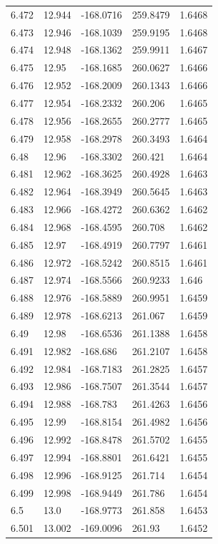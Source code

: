 \begin{tabular}{lllll}
6.472 & 12.944 & -168.0716 & 259.8479 & 1.6468 \\
6.473 & 12.946 & -168.1039 & 259.9195 & 1.6468 \\
6.474 & 12.948 & -168.1362 & 259.9911 & 1.6467 \\
6.475 & 12.95 & -168.1685 & 260.0627 & 1.6466 \\
6.476 & 12.952 & -168.2009 & 260.1343 & 1.6466 \\
6.477 & 12.954 & -168.2332 & 260.206 & 1.6465 \\
6.478 & 12.956 & -168.2655 & 260.2777 & 1.6465 \\
6.479 & 12.958 & -168.2978 & 260.3493 & 1.6464 \\
6.48 & 12.96 & -168.3302 & 260.421 & 1.6464 \\
6.481 & 12.962 & -168.3625 & 260.4928 & 1.6463 \\
6.482 & 12.964 & -168.3949 & 260.5645 & 1.6463 \\
6.483 & 12.966 & -168.4272 & 260.6362 & 1.6462 \\
6.484 & 12.968 & -168.4595 & 260.708 & 1.6462 \\
6.485 & 12.97 & -168.4919 & 260.7797 & 1.6461 \\
6.486 & 12.972 & -168.5242 & 260.8515 & 1.6461 \\
6.487 & 12.974 & -168.5566 & 260.9233 & 1.646 \\
6.488 & 12.976 & -168.5889 & 260.9951 & 1.6459 \\
6.489 & 12.978 & -168.6213 & 261.067 & 1.6459 \\
6.49 & 12.98 & -168.6536 & 261.1388 & 1.6458 \\
6.491 & 12.982 & -168.686 & 261.2107 & 1.6458 \\
6.492 & 12.984 & -168.7183 & 261.2825 & 1.6457 \\
6.493 & 12.986 & -168.7507 & 261.3544 & 1.6457 \\
6.494 & 12.988 & -168.783 & 261.4263 & 1.6456 \\
6.495 & 12.99 & -168.8154 & 261.4982 & 1.6456 \\
6.496 & 12.992 & -168.8478 & 261.5702 & 1.6455 \\
6.497 & 12.994 & -168.8801 & 261.6421 & 1.6455 \\
6.498 & 12.996 & -168.9125 & 261.714 & 1.6454 \\
6.499 & 12.998 & -168.9449 & 261.786 & 1.6454 \\
6.5 & 13.0 & -168.9773 & 261.858 & 1.6453 \\
6.501 & 13.002 & -169.0096 & 261.93 & 1.6452 \\

\end{tabular}
